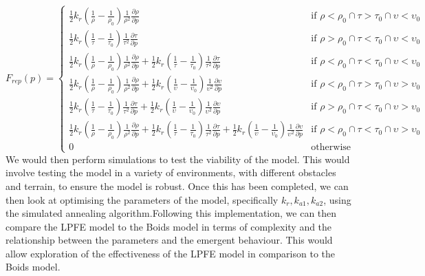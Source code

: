 \documentclass[12pt]{article}
\begin{document}
\begin{equation}
    F_{rep}(p) = 
    \begin{cases}
        \frac{1}{2}k_r(\frac{1}{\rho}-\frac{1}{\rho_{0}})\frac{1}{\rho^2}\frac{\partial \rho}{\partial p} & \text{if } \rho < \rho_{0} \cap \tau > \tau_{0} \cap \upsilon < \upsilon_{0}\\
        \frac{1}{2}k_r(\frac{1}{\tau}-\frac{1}{\tau_{0}})\frac{1}{\tau^2}\frac{\partial \tau}{\partial p} & \text{if } \rho > \rho_{0} \cap \tau < \tau_{0} \cap \upsilon < \upsilon_{0}\\
        \frac{1}{2}k_r(\frac{1}{\rho}-\frac{1}{\rho_{0}})\frac{1}{\rho^2}\frac{\partial \rho}{\partial p} + \frac{1}{2}k_r(\frac{1}{\tau}-\frac{1}{\tau_{0}})\frac{1}{\tau^2}\frac{\partial \tau}{\partial p} & \text{if } \rho < \rho_{0} \cap \tau < \tau_{0} \cap \upsilon < \upsilon_{0}\\
        \frac{1}{2}k_r(\frac{1}{\rho}-\frac{1}{\rho_{0}})\frac{1}{\rho^2}\frac{\partial \rho}{\partial p} + \frac{1}{2}k_r(\frac{1}{\upsilon}-\frac{1}{\upsilon_{0}})\frac{1}{\upsilon^2}\frac{\partial \upsilon}{\partial p} & \text{if } \rho < \rho_{0} \cap \tau > \tau_{0} \cap \upsilon > \upsilon_{0}\\
        \frac{1}{2}k_r(\frac{1}{\tau}-\frac{1}{\tau_{0}})\frac{1}{\tau^2}\frac{\partial \tau}{\partial p} + \frac{1}{2}k_r(\frac{1}{\upsilon}-\frac{1}{\upsilon_{0}})\frac{1}{\upsilon^2}\frac{\partial \upsilon}{\partial p} & \text{if } \rho > \rho_{0} \cap \tau < \tau_{0} \cap \upsilon > \upsilon_{0}\\
        \frac{1}{2}k_r(\frac{1}{\rho}-\frac{1}{\rho_{0}})\frac{1}{\rho^2}\frac{\partial \rho}{\partial p} + \frac{1}{2}k_r(\frac{1}{\tau}-\frac{1}{\tau_{0}})\frac{1}{\tau^2}\frac{\partial \tau}{\partial p} + \frac{1}{2}k_r(\frac{1}{\upsilon}-\frac{1}{\upsilon_{0}})\frac{1}{\upsilon^2}\frac{\partial \upsilon}{\partial p} & \text{if } \rho < \rho_{0} \cap \tau < \tau_{0} \cap \upsilon > \upsilon_{0}\\
        0 & \text{otherwise}
    \end{cases}
\end{equation}
We would then perform simulations to test the viability of the model. This would involve testing the model in a variety of environments, with different obstacles and terrain, to ensure the model is robust. Once this has been completed, we can then look at optimising the parameters of the model, specifically $k_r,k_{a1},k_{a2}$, using the simulated annealing algorithm.Following this implementation, we can then compare the LPFE model to the Boids model in terms of complexity and the relationship between the parameters and the emergent behaviour. This would allow exploration of the effectiveness of the LPFE model in comparison to the Boids model.
\end{document}
